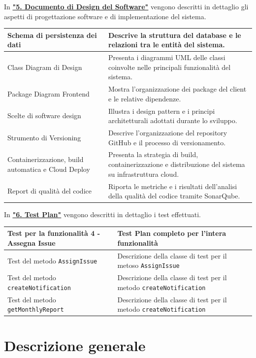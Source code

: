 \documentclass[a4paper,12pt]{article}
\begin{document}
In \hyperref[sec:designSoftware]{\textbf{"5. Documento di Design del Software"}} vengono descritti in dettaglio gli aspetti di progettazione software e di implementazione del sistema. 
\begin{longtable}{|p{5cm}|p{9cm}|} 
\hline 
Schema di persistenza dei dati & Descrive la struttura del database e le relazioni tra le entità del sistema. \\ \hline 
Class Diagram di Design & Presenta i diagrammi UML delle classi coinvolte nelle principali funzionalità del sistema. \\ \hline 
Package Diagram Frontend & Mostra l'organizzazione dei package del client e le relative dipendenze. \\ \hline 
Scelte di software design & Illustra i design pattern e i principi architetturali adottati durante lo sviluppo. \\ \hline 
Strumento di Versioning & Descrive l'organizzazione del repository GitHub e il processo di versionamento. \\ \hline 
Containerizzazione, build automatica e Cloud Deploy & Presenta la strategia di build, containerizzazione e distribuzione del sistema su infrastruttura cloud. \\ \hline 
Report di qualità del codice & Riporta le metriche e i risultati dell'analisi della qualità del codice tramite SonarQube. \\ \hline 
\end{longtable}

In \hyperref[sec:testPlan]{\textbf{"6. Test Plan"}} vengono descritti in dettaglio i test effettuati.
\begin{longtable}{|p{5cm}|p{9cm}|} 
\hline 
Test per la funzionalità 4 - Assegna Issue & Test Plan completo per l'intera funzionalità \\ \hline 
Test del metodo \texttt{AssignIssue} & Descrizione della classe di test per il metoso \texttt{AssignIssue} \\ \hline 
Test del metodo \texttt{createNotification} & Descrizione della classe di test per il metodo \texttt{createNotification} \\ \hline 
Test del metodo \texttt{getMonthlyReport} & Descrizione della classe di test per il metodo \texttt{createNotification} \\ \hline 
\end{longtable}

\newpage
\label{sec:descrizioneGenerale}
\section{Descrizione generale}
\end{document}
